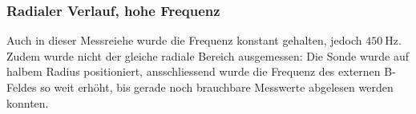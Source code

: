 {    %
    \subsubsection{Radialer Verlauf, hohe Frequenz}
    \label{sec:ausw:subsec:vollz:subsubsec:highfreq}

	\begin{minipage}[t]{0.33\textwidth}
        \vspace{0mm}
        Auch  in  dieser  Messreiehe  wurde die  Frequenz  konstant  gehalten,
        jedoch  $\SI{450}{\hertz}$. Zudem  wurde  nicht  der  gleiche  radiale
        Bereich ausgemessen: Die  Sonde wurde auf halbem  Radius positioniert,
        ansschliessend  wurde  die  Frequenz  des externen  B-Feldes  so  weit
        erh\"oht,  bis  gerade  noch  brauchbare  Messwerte  abgelesen  werden
        konnten.



\end{minipage}}
